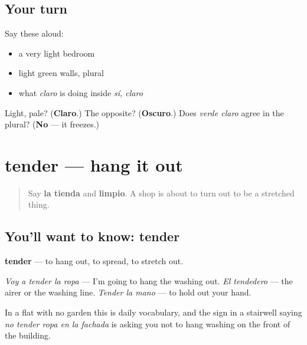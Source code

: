 \subsection*{Your turn}
Say these aloud:

\begin{itemize}
\raggedright
  \item a very light bedroom
  \item light green walls, plural
  \item what \emph{claro} is doing inside \emph{sí, claro}
\end{itemize}

\begin{tcolorbox}[breakable,colback=teal!4,colframe=teal!35!black,title={Before you move on}]
Light, pale? (\textbf{Claro}.) The opposite? (\textbf{Oscuro}.) Does \emph{verde claro} agree in the plural? (\textbf{No} — it freezes.)
\end{tcolorbox}
\section[tender]{tender — hang it out}

\label{lesson:ES-C455-tender}



\begin{quote}
Say \textbf{la tienda} and \textbf{limpio}. A shop is about to turn out to be a stretched thing.
\end{quote}

\subsection*{You'll want to know: tender}
\textbf{tender} — to hang out, to spread, to stretch out.

\emph{Voy a tender la ropa} — I'm going to hang the washing out. \emph{El tendedero} — the airer or the washing line. \emph{Tender la mano} — to hold out your hand.

In a flat with no garden this is daily vocabulary, and the sign in a stairwell saying \emph{no tender ropa en la fachada} is asking you not to hang washing on the front of the building.

